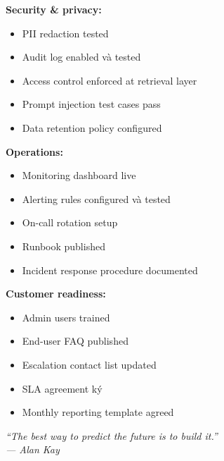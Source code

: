 \documentclass[11pt,a4paper]{article}
\begin{document}
\textbf{Security \& privacy:}
\begin{itemize}
\item[$\square$] PII redaction tested
\item[$\square$] Audit log enabled và tested
\item[$\square$] Access control enforced at retrieval layer
\item[$\square$] Prompt injection test cases pass
\item[$\square$] Data retention policy configured
\end{itemize}

\textbf{Operations:}
\begin{itemize}
\item[$\square$] Monitoring dashboard live
\item[$\square$] Alerting rules configured và tested
\item[$\square$] On-call rotation setup
\item[$\square$] Runbook published
\item[$\square$] Incident response procedure documented
\end{itemize}

\textbf{Customer readiness:}
\begin{itemize}
\item[$\square$] Admin users trained
\item[$\square$] End-user FAQ published
\item[$\square$] Escalation contact list updated
\item[$\square$] SLA agreement ký
\item[$\square$] Monthly reporting template agreed
\end{itemize}

\vfill

\begin{center}
\small\itshape\color{mid}
``The best way to predict the future is to build it.''\\
--- Alan Kay
\end{center}
\end{document}
